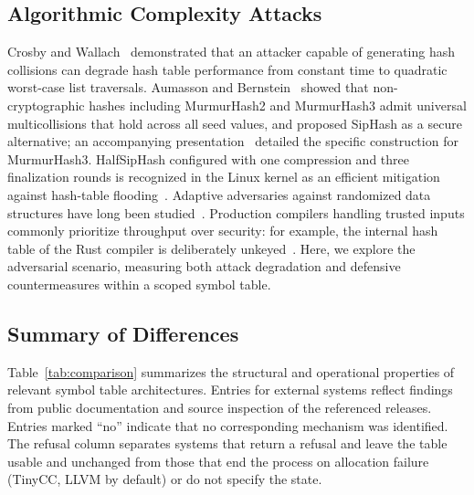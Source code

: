 \subsection{Algorithmic Complexity Attacks}
Crosby and Wallach~\cite{crosby2003} demonstrated that an attacker capable of generating hash collisions can degrade hash table performance from constant time to quadratic worst-case list traversals. Aumasson and Bernstein~\cite{aumasson2012} showed that non-cryptographic hashes including MurmurHash2 and MurmurHash3 admit universal multicollisions that hold across all seed values, and proposed SipHash as a secure alternative; an accompanying presentation~\cite{aumassonslides} detailed the specific construction for MurmurHash3. HalfSipHash configured with one compression and three finalization rounds is recognized in the Linux kernel as an efficient mitigation against hash-table flooding~\cite{linuxsiphash}. Adaptive adversaries against randomized data structures have long been studied~\cite{lipton1993,naor2015}. Production compilers handling trusted inputs commonly prioritize throughput over security: for example, the internal hash table of the Rust compiler is deliberately unkeyed~\cite{rustchash}. Here, we explore the adversarial scenario, measuring both attack degradation and defensive countermeasures within a scoped symbol table.

\subsection{Summary of Differences}
Table~\ref{tab:comparison} summarizes the structural and operational properties of relevant symbol table architectures. Entries for external systems reflect findings from public documentation and source inspection of the referenced releases. Entries marked ``no'' indicate that no corresponding mechanism was identified. The refusal column separates systems that return a refusal and leave the table usable and unchanged from those that end the process on allocation failure (TinyCC, LLVM by default) or do not specify the state.


